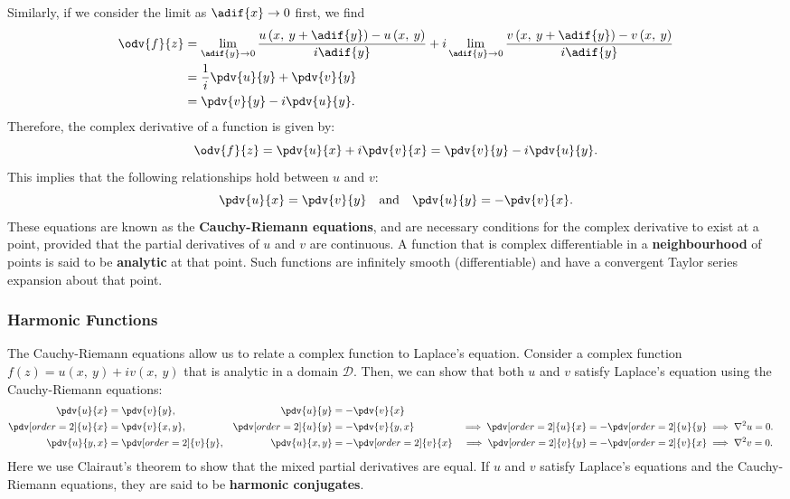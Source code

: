 \documentclass{article}
\begin{document}
Similarly, if we consider the limit as \(\adif{x} \to 0\) first, we find
\begin{align*}
    \odv{f}{z} & = \lim_{\adif{y} \to 0} \frac{u\left( x,\: y + \adif{y} \right) - u\left( x,\: y \right)}{i \adif{y}} + i \lim_{\adif{y} \to 0} \frac{v\left( x,\: y + \adif{y} \right) - v\left( x,\: y \right)}{i \adif{y}} \\
               & = \frac{1}{i} \pdv{u}{y} + \pdv{v}{y} \\
               &= \pdv{v}{y} - i \pdv{u}{y}.
\end{align*}
Therefore, the complex derivative of a function is given by:
\begin{equation*}
    \odv{f}{z} = \pdv{u}{x} + i \pdv{v}{x} = \pdv{v}{y} - i \pdv{u}{y}.
\end{equation*}
This implies that the following relationships hold between \(u\) and
\(v\):
\begin{equation*}
    \pdv{u}{x} = \pdv{v}{y} \quad \text{and} \quad \pdv{u}{y} = -\pdv{v}{x}.
\end{equation*}
These equations are known as the \textbf{Cauchy-Riemann equations}, and
are necessary conditions for the complex derivative to exist at a point,
provided that the partial derivatives of \(u\) and \(v\) are continuous.
A function that is complex differentiable in a \textbf{neighbourhood} of
points is said to be \textbf{analytic} at that point. Such functions are
infinitely smooth (differentiable) and have a convergent Taylor series
expansion about that point.
\subsubsection{Harmonic Functions}
The Cauchy-Riemann equations allow us to relate a complex function to
Laplace's equation. Consider a complex function \(f\left( z \right) =
u\left( x,\: y \right) + i v\left( x,\: y \right)\) that is analytic in
a domain \(\mathcal{D}\). Then, we can show that both \(u\) and \(v\)
satisfy Laplace's equation using the Cauchy-Riemann equations:
\begin{align*}
    \pdv{u}{x} & = \pdv{v}{y}, & \pdv{u}{y} & = -\pdv{v}{x} \\
    \pdv[order=2]{u}{x} & = \pdv{v}{x,y}, & \pdv[order=2]{u}{y} & = -\pdv{v}{y,x} & \implies \pdv[order=2]{u}{x} = -\pdv[order=2]{u}{y} & \implies \nabla^2 u = 0. \\
    \pdv{u}{y,x} & = \pdv[order=2]{v}{y}, & \pdv{u}{x,y} & = -\pdv[order=2]{v}{x} & \implies \pdv[order=2]{v}{y} = -\pdv[order=2]{v}{x} & \implies \nabla^2 v = 0.
\end{align*}
Here we use Clairaut's theorem to show that the mixed partial derivatives
are equal. If \(u\) and \(v\) satisfy Laplace's equations and the
Cauchy-Riemann equations, they are said to be \textbf{harmonic
conjugates}.
\end{document}
